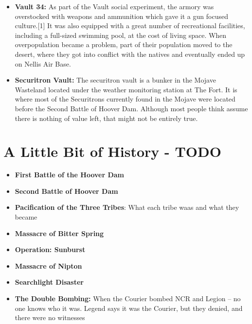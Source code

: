 \documentclass[11pt]{article} %
\begin{document}
\begin{itemize}
	\item \textbf{Vault 34:} As part of the Vault social experiment, the armory was overstocked with weapons and ammunition which gave it a gun focused culture.[1] It was also equipped with a great number of recreational facilities, including a full-sized swimming pool, at the cost of living space. When overpopulation became a problem, part of their population moved to the desert, where they got into conflict with the natives and eventually ended up on Nellis Air Base.
	
	\item \textbf{Securitron Vault:} The securitron vault is a bunker in the Mojave Wasteland located under the weather monitoring station at The Fort. It is where most of the Securitrons currently found in the Mojave were located before the Second Battle of Hoover Dam. Although most people think assume there is nothing of value left, that might not be entirely true.
\end{itemize}


\section{A Little Bit of History - TODO}

\begin{itemize}
	\item \textbf{First Battle of the Hoover Dam}
	
	\item \textbf{Second Battle of Hoover Dam}
	
	\item \textbf{Pacification of the Three Tribes}: What each tribe waas and what they became
	
	\item \textbf{Massacre of Bitter Spring}
	
	\item \textbf{Operation: Sunburst}
	
	\item \textbf{Massacre of Nipton}
	
	\item \textbf{Searchlight Disaster}
	
	\item \textbf{The Double Bombing:} When the Courier bombed NCR and Legion -- no one knows who it was. Legend says it was the Courier, but they denied, and there were no witnesses
\end{itemize}


\newpage
\textit{      }
\newpage
\end{document}
